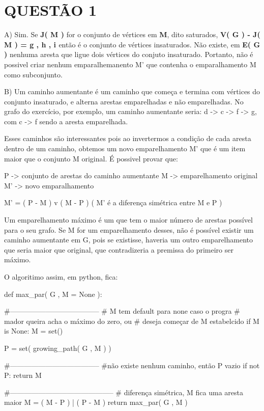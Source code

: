 \documentclass{article}
\begin{document}
\section{ QUESTÃO 1 }

A) Sim. Se \textbf{ J( M ) } for o conjunto de vértices em \textbf{M}, dito saturados, \textbf{ V( G ) - J( M ) = { g , h , i } } então é o conjunto de vértices insaturados. Não existe, em \textbf{E( G )} nenhuma aresta que ligue dois vértices do conjuto insaturado. Portanto, não é possivel criar nenhum emparalhemanento M' que contenha o emparalhamento M como subconjunto.

B) Um caminho aumentante é um caminho que começa e termina com vértices do conjunto insaturado, e alterna arestas emparelhadas e não emparelhadas. No grafo do exercício, por exemplo, um caminho aumentante seria: d -> c -> f -> g, com c -> f sendo a aresta emparelhada.

Esses caminhos são interessantes pois ao invertermos a condição de cada aresta dentro de um caminho, obtemos um novo emparelhamento M' que é um item maior que o conjunto M original. É possivel provar que:

   P -> conjunto de arestas do caminho aumentante
   M -> emparelhamento original
   M' -> novo emparalhamento

   M' = ( P - M ) v ( M - P ) ( M' é a diferença simétrica entre M e P )

Um emparelhamento máximo é um que tem o maior número de arestas possível para o seu grafo. Se M for um emparelhamento desses, não é possível existir um caminho aumentante em G, pois se existisse, haveria um outro emparelhamento que seria maior que original, que contradizeria a premissa do primeiro ser máximo.

O algoritimo assim, em python, fica:

def max_par( G , M = None ):

   #--------------------------------------
   # M tem default para none caso o progra
   # mador queira acha o máximo do zero, ou
   # deseja começar de M estabelcido
   if M is None:
      M = set()
   
   P = set( growing_path( G , M ) )

   #--------------------------------------
   #não existe nenhum caminho, então P vazio
   if not P: 
      return M

   #--------------------------------------------
   # diferença simétrica, M fica uma aresta maior
   M = ( M - P ) | ( P - M ) 
   return max_par( G , M )
\end{document}
